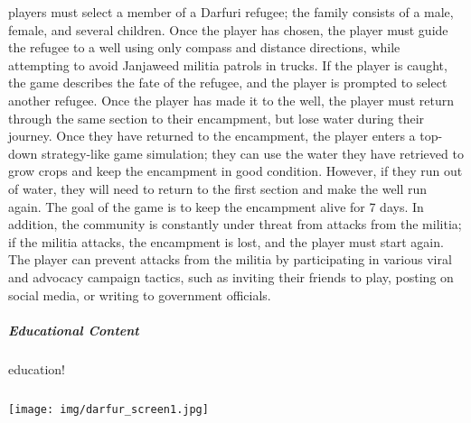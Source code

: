 players must select a member of a Darfuri refugee; the family consists of a male, female, and several children. Once the player has chosen, the player must guide the refugee to a well using only compass and distance directions, while attempting to avoid Janjaweed militia patrols in trucks. If the player is caught, the game describes the fate of the refugee, and the player is prompted to select another refugee. Once the player has made it to the well, the player must return through the same section to their encampment, but lose water during their journey. Once they have returned to the encampment, the player enters a top-down strategy-like game simulation; they can use the water they have retrieved to grow crops and keep the encampment in good condition. However, if they run out of water, they will need to return to the first section and make the well run again. The goal of the game is to keep the encampment alive for 7 days. In addition, the community is constantly under threat from attacks from the militia; if the militia attacks, the encampment is lost, and the player must start again. The player can prevent attacks from the militia by participating in various viral and advocacy campaign tactics, such as inviting their friends to play, posting on social media, or writing to government officials. \subparagraph{Educational Content}education!\subparagraph{}\texttt{[image: img/darfur\_screen1.jpg]}\newpage